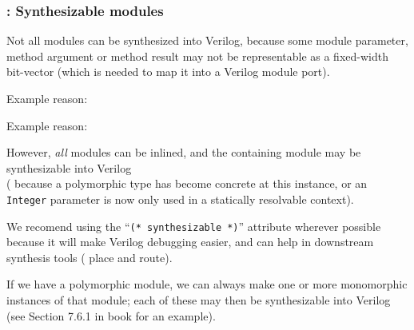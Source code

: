 \begin{frame}[fragile]
\frametitle{{\BSV}: Synthesizable modules}

\footnotesize

Not all {\BSV} modules can be synthesized into Verilog, because some
module parameter, method argument or method result may not be
representable as a fixed-width bit-vector (which is needed to map it
into a Verilog module port).

\vspace{2ex}

Example reason: \hm
{}

Example reason: \hm
{}

\vspace{1ex}

\PAUSE{\vspace{2ex}}

However, \emph{all} {\BSV} modules can be inlined, and the containing
module may be synthesizable into Verilog \\
({\eg} because a polymorphic type has become concrete at this
instance, or an {\tt Integer} parameter is now only used in a
statically resolvable context).

\PAUSE{\vspace{2ex}}

We recomend using the ``{\tt (* synthesizable *)}'' attribute wherever
possible because it will make Verilog debugging easier, and can help
in downstream synthesis tools ({\eg} place and route).

\PAUSE{\vspace{2ex}}

If we have a polymorphic module, we can always make one or more
monomorphic instances of that module; each of these may then be
synthesizable into Verilog (see Section 7.6.1 in book for an example).

\end{frame}


